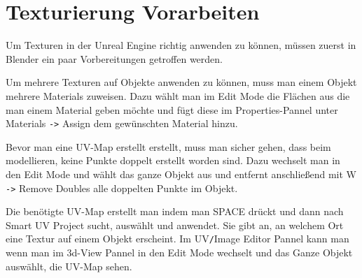 \section{Texturierung Vorarbeiten}
Um Texturen in der Unreal Engine richtig anwenden zu können, müssen zuerst in Blender ein paar Vorbereitungen getroffen werden.

Um mehrere Texturen auf Objekte anwenden zu können, muss man einem Objekt mehrere Materials zuweisen. Dazu wählt man im Edit Mode die Flächen aus die man einem Material geben
möchte und fügt diese im Properties-Pannel unter Materials \verb+->+ Assign dem gewünschten Material hinzu.

Bevor man eine UV-Map erstellt erstellt, muss man sicher gehen, dass beim modellieren, keine Punkte
doppelt erstellt worden sind. Dazu wechselt man in den Edit Mode und wählt das ganze Objekt aus und entfernt anschließend mit W \verb+->+
Remove Doubles alle doppelten Punkte im Objekt.

Die benötigte UV-Map erstellt man indem man SPACE drückt und dann nach Smart UV Project sucht, auswählt und anwendet. Sie gibt an, an welchem Ort
eine Textur auf einem Objekt erscheint. Im UV\verb-/-Image Editor Pannel kann man wenn man im 3d-View Pannel in den Edit Mode
wechselt und das Ganze Objekt auswählt, die UV-Map sehen.
